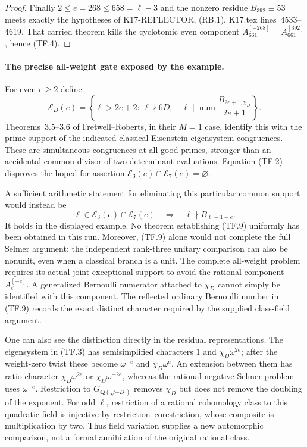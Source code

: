 \begin{proof}
Finally $2\leq e=268\leq658=\ell-3$ and the nonzero
residue $B_{392}\equiv53$ meets exactly the hypotheses
of K17-REFLECTOR, (RB.1), K17.tex lines~4533--4619.
That carried theorem kills the cyclotomic even component
$A_{661}^{[-268]}=A_{661}^{[392]}$, hence (TF.4).
\end{proof}

\paragraph{The precise all-weight gate exposed by the example.}
For even $e\geq2$ define
\[
 \mathcal E_D(e)=\left\{\ell>2e+2:\ \ell\nmid6D,\quad
       \ell\mid\operatorname{num}
                 \frac{B_{2e+1,\chi_D}}{2e+1}\right\}.
                                                               \tag{TF.8}
\]
Theorems~3.5--3.6 of Fretwell--Roberts, in their $M=1$
case, identify this with the prime support of the indicated
classical Eisenstein eigensystem congruences. These are
simultaneous congruences at all good primes, stronger than
an accidental common divisor of two determinant evaluations.
Equation (TF.2) disproves the hoped-for assertion
$\mathcal E_3(e)\cap\mathcal E_7(e)=\varnothing$.

A sufficient arithmetic statement for eliminating this
particular common support would instead be
\[
 \ell\in\mathcal E_3(e)\cap\mathcal E_7(e)
          \quad\Longrightarrow\quad
                   \ell\nmid B_{\ell-1-e}.
                                                               \tag{TF.9}
\]
It holds in the displayed example. No theorem establishing
(TF.9) uniformly has been obtained in this run. Moreover,
(TF.9) alone would not complete the full Selmer argument:
the independent rank-three unitary comparison can also be
nonunit, even when a classical branch is a unit. The
complete all-weight problem requires its actual joint
exceptional support to avoid the rational component
$A_\ell^{[-e]}$. A generalized Bernoulli numerator attached
to $\chi_D$ cannot simply be identified with this component.
The reflected ordinary Bernoulli number in (TF.9) records
the exact distinct character required by the supplied
class-field argument.

One can also see the distinction directly in the residual
representations. The eigensystem in (TF.3) has semisimplified
characters $1$ and $\chi_D\omega^{2e}$; after the weight-zero
twist these become $\omega^{-e}$ and $\chi_D\omega^e$.
An extension between them has ratio character
$\chi_D\omega^{2e}$ or $\chi_D\omega^{-2e}$, whereas
the rational negative Selmer problem uses $\omega^{-e}$.
Restriction to $G_{\mathbf Q(\sqrt{-D})}$ removes
$\chi_D$ but does not remove the doubling of the exponent.
For odd $\ell$, restriction of a rational cohomology class
to this quadratic field is injective by restriction--corestriction,
whose composite is multiplication by two. Thus field
variation supplies a new automorphic comparison, not a
formal annihilation of the original rational class.

